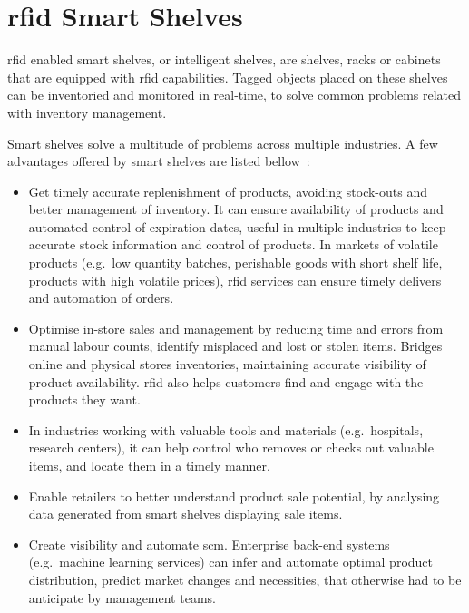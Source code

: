\chapter{\acs{rfid} Smart Shelves}

\ac{rfid} enabled smart shelves, or intelligent shelves, are shelves, racks or cabinets that are equipped with \ac{rfid} capabilities.
Tagged objects placed on these shelves can be inventoried and monitored in real-time, to solve common problems related with inventory management.

Smart shelves solve a multitude of problems across multiple industries. A few advantages offered by smart shelves are listed bellow~\cite{lahiriRFIDSourcebook2005, WhatYouNeed, FutureRetailShopping, SmartShelvesKey2019}:

\begin{itemize}
    \item Get timely accurate replenishment of products, avoiding stock-outs and better management of inventory. It can ensure availability of products and automated control of expiration dates, useful in multiple industries to keep accurate stock information and control of products. In markets of volatile products (e.g.\ low quantity batches, perishable goods with short shelf life, products with high volatile prices), \ac{rfid} services can ensure timely delivers and automation of orders.
    \item Optimise in-store sales and management by reducing time and errors from manual labour counts, identify misplaced and lost or stolen items. Bridges online and physical stores inventories, maintaining accurate visibility of product availability. \ac{rfid} also helps customers find and engage with the products they want.
    \item In industries working with valuable tools and materials (e.g.\ hospitals, research centers), it can help control who removes or checks out valuable items, and locate them in a timely manner.
    \item Enable retailers to better understand product sale potential, by analysing data generated from smart shelves displaying sale items.
    \item Create visibility and automate \ac{scm}. Enterprise back-end systems (e.g.\ machine learning services) can infer and automate optimal product distribution, predict market changes and necessities, that otherwise had to be anticipate by management teams.
\end{itemize}


